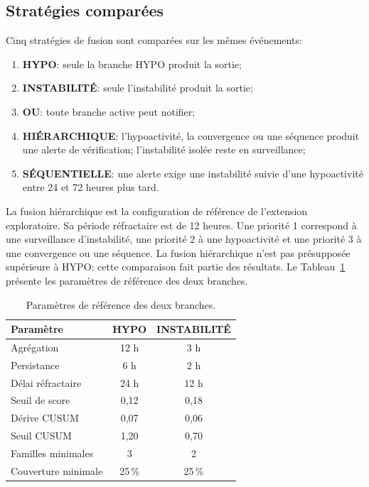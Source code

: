 \subsection{Stratégies comparées}
Cinq stratégies de fusion sont comparées sur les mêmes événements:
\begin{enumerate}
  \item \textbf{HYPO}: seule la branche HYPO produit la sortie;
  \item \textbf{INSTABILITÉ}: seule l'instabilité produit la sortie;
  \item \textbf{OU}: toute branche active peut notifier;
  \item \textbf{HIÉRARCHIQUE}: l'hypoactivité, la convergence ou une séquence produit une
  alerte de vérification; l'instabilité isolée reste en surveillance;
  \item \textbf{SÉQUENTIELLE}: une alerte exige une instabilité suivie d'une hypoactivité
  entre 24 et 72 heures plus tard.
\end{enumerate}
La fusion hiérarchique est la configuration de référence de l'extension exploratoire. Sa
période réfractaire est de 12 heures. Une priorité 1 correspond à une surveillance
d'instabilité, une priorité 2 à une hypoactivité et une priorité 3 à une convergence ou une
séquence. La fusion hiérarchique n'est pas présupposée supérieure à HYPO: cette comparaison
fait partie des résultats. Le Tableau~\ref{tab:config_finale} présente les paramètres de
référence des deux branches.

\begin{table}[H]
  \centering
  \caption{Paramètres de référence des deux branches.}
  \label{tab:config_finale}
  \small
  \begin{tabular}{lcc}
    \toprule
    Paramètre & HYPO & INSTABILITÉ \\
    \midrule
    Agrégation & 12 h & 3 h \\
    Persistance & 6 h & 2 h \\
    Délai réfractaire & 24 h & 12 h \\
    Seuil de score & 0,12 & 0,18 \\
    Dérive CUSUM & 0,07 & 0,06 \\
    Seuil CUSUM & 1,20 & 0,70 \\
    Familles minimales & 3 & 2 \\
    Couverture minimale & 25\,\% & 25\,\% \\
    \bottomrule
  \end{tabular}
\end{table}

